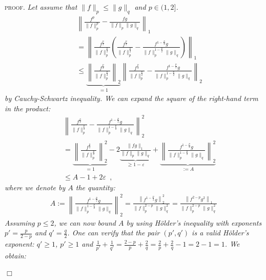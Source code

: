 \documentclass{article} %
\newcommand{\Holder}{H\"older\xspace}
\newcommand{\f}{f}
\newcommand{\g}{g}
\newcommand{\q}{q}
\def\p{p}
\newenvironment{proof}{\textsc{proof.}\it}{\hfill{$\Box$}}
\begin{document}
\begin{proof}
Let assume that  $\|\f\|_{\p} \le \|\g\|_{\q}$ and $p\in(1,2]$. 
\begin{eqnarray}
&&
\left\|
	\frac{\f^{\p}}{\|\f\|^{\p}_{\p}} 
	- 
	\frac{\f\g}{\|\f\|_\p \|\g\|_\q} 
\right\|_1
\nonumber\\
 &&= 
\left\|
	\frac{\f^{\frac{\p}{2}}}{\|\f\|^{\frac{\p}{2}}_{\p}} \left(\frac{\f^{\frac{\p}{2}}}{\|\f\|^{\frac{\p}{2}}_{\p}}
	- 
	\frac{\f^{1-\frac{\p}{2}}\g}{\|\f\|^{1-\frac{\p}{2}}_\p \|\g\|_\q} 
	 \right)
\right\|_1 
\nonumber\\
&&\le
\underbrace{
\left\|
	\frac{\f^{\frac{\p}{2}}}{\|\f\|^{\frac{\p}{2}}_{\p}} 
\right\|_2
}_{=1}
\left\|	
	\frac{\f^{\frac{\p}{2}}}{\|\f\|^{\frac{\p}{2}}_{\p}}
	- 
	\frac{\f^{1-\frac{\p}{2}}\g}{\|\f\|^{1-\frac{\p}{2}}_\p \|\g\|_\q} 
\right\|_2 
\label{eq:temp1}
\nonumber
\end{eqnarray}
by Cauchy-Schwartz inequality. We can expand the square of the right-hand term in the product:
\begin{eqnarray}
&&\left\|	
	\frac{\f^{\frac{\p}{2}}}{\|\f\|^{\frac{\p}{2}}_{\p}}
	- 
	\frac{\f^{1-\frac{\p}{2}}\g}{\|\f\|^{1-\frac{\p}{2}}_\p \|\g\|_\q} 
\right\|_2^2 
\nonumber\\
&&= 
\underbrace{
\left\|	
	\frac{\f^{\frac{\p}{2}}}{\|\f\|^{\frac{\p}{2}}_{\p}}
\right\|_2^2
}_{=1}
- 2 
\underbrace{
\frac{\|fg\|_1}{\|\f\|_\p \|\g\|_\q}
}_{\ge 1-\varepsilon}
+ 
\underbrace{
\left\|	
	\frac{\f^{1-\frac{\p}{2}}\g}{\|\f\|^{1-\frac{\p}{2}}_\p \|\g\|_\q} 
\right\|_2^2
}_{:=A}
\nonumber
\\
&&\le A - 1 + 2\varepsilon
\label{eq:temp2}
\enspace,
\end{eqnarray}
where we denote by $A$ the quantity:
\begin{eqnarray}
A := \left\|	
	\frac{\f^{1-\frac{\p}{2}}\g}{\|\f\|^{1-\frac{\p}{2}}_\p \|\g\|_\q} 
\right\|_2^2
=\frac{\left\|	\f^{1-\frac{\p}{2}}\g \right\|_2^2}{\|\f\|^{2-\p}_\p \|\g\|_\q^2} 
=
	\frac{\left\|	\f^{2-\p}\g^2 \right\|_1}{\|\f\|^{2-\p}_\p \|\g\|_\q^2} 
\nonumber
\end{eqnarray}
Assuming $\p\le 2$, we can now bound $A$ by using \Holder's inequality with exponents $p'=\frac{\p}{2-\p}$ and $\q'=\frac{\q}{2}$. One can verify that the pair $(p',q')$ is a valid \Holder's exponent: $\q'\ge 1$, $\p'\ge1$ and $\frac{1}{\p'}+\frac{1}{\q'}=\frac{2-\p}{\p} + \frac{2}{\q} = \frac{2}{\p} +\frac{2}{\q} - 1 = 2-1=1$. We obtain:

\end{proof}
\end{document}
